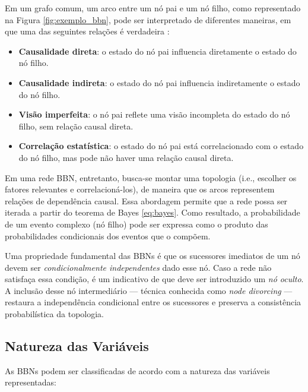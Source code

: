 Em um grafo comum, um arco entre um nó pai e um nó filho, como representado na Figura \ref{fig:exemplo_bbn}, pode ser interpretado de diferentes maneiras, em que uma das seguintes relações é verdadeira \cite{9}:
\begin{itemize}
  \item \textbf{Causalidade direta}: o estado do nó pai influencia diretamente o estado do nó filho.
  \item \textbf{Causalidade indireta}: o estado do nó pai influencia indiretamente o estado do nó filho.
  \item \textbf{Visão imperfeita}: o nó pai reflete uma visão incompleta do estado do nó filho, sem relação causal direta.
  \item \textbf{Correlação estatística}: o estado do nó pai está correlacionado com o estado do nó filho, mas pode não haver uma relação causal direta.

\end{itemize}

Em uma rede BBN, entretanto, busca-se montar uma topologia (i.e., escolher os fatores relevantes e correlacioná-los), de maneira que os arcos representem relações de dependência causal. Essa abordagem permite que a rede possa ser iterada a partir do teorema de Bayes \ref{eq:bayes}. Como resultado, a probabilidade de um evento complexo (nó filho) pode ser expressa como o produto das probabilidades condicionais dos eventos que o compõem.

Uma propriedade fundamental das BBNs é que os sucessores imediatos de um nó devem ser \emph{condicionalmente independentes} dado esse nó. Caso a rede não satisfaça essa condição, é um indicativo de que deve ser introduzido um \emph{nó oculto}. \cite{19} A inclusão desse nó intermediário — técnica conhecida como \emph{node divorcing} — restaura a independência condicional entre os sucessores e preserva a consistência probabilística da topologia.




\subsection{Natureza das Variáveis}

As BBNs podem ser classificadas de acordo com a natureza das variáveis representadas:


